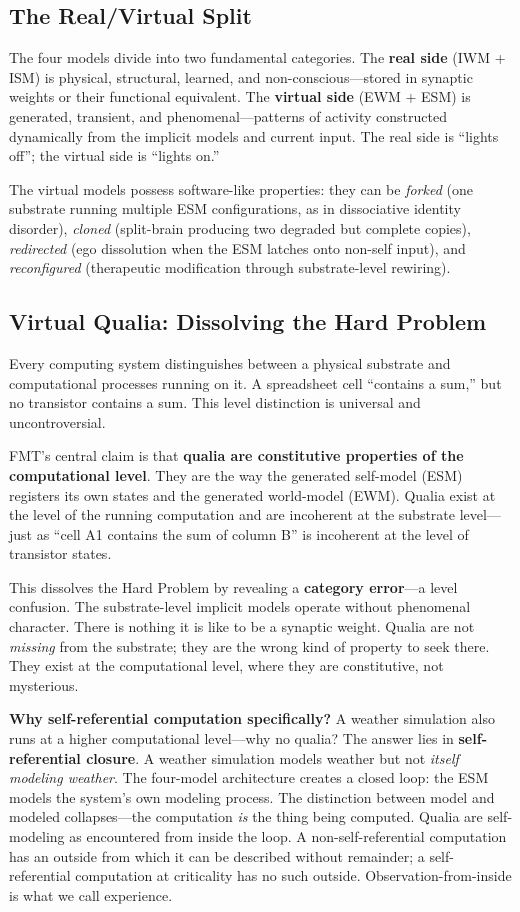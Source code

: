 \documentclass[11pt]{article}
\begin{document}
\subsection{The Real/Virtual Split}

The four models divide into two fundamental categories. The \textbf{real side} (IWM + ISM) is physical, structural, learned, and non-conscious---stored in synaptic weights or their functional equivalent. The \textbf{virtual side} (EWM + ESM) is generated, transient, and phenomenal---patterns of activity constructed dynamically from the implicit models and current input. The real side is ``lights off''; the virtual side is ``lights on.''

The virtual models possess software-like properties: they can be \emph{forked} (one substrate running multiple ESM configurations, as in dissociative identity disorder), \emph{cloned} (split-brain producing two degraded but complete copies), \emph{redirected} (ego dissolution when the ESM latches onto non-self input), and \emph{reconfigured} (therapeutic modification through substrate-level rewiring).

\subsection{Virtual Qualia: Dissolving the Hard Problem}

Every computing system distinguishes between a physical substrate and computational processes running on it. A spreadsheet cell ``contains a sum,'' but no transistor contains a sum. This level distinction is universal and uncontroversial.

FMT's central claim is that \textbf{qualia are constitutive properties of the computational level}. They are the way the generated self-model (ESM) registers its own states and the generated world-model (EWM). Qualia exist at the level of the running computation and are incoherent at the substrate level---just as ``cell A1 contains the sum of column B'' is incoherent at the level of transistor states.

This dissolves the Hard Problem by revealing a \textbf{category error}---a level confusion. The substrate-level implicit models operate without phenomenal character. There is nothing it is like to be a synaptic weight. Qualia are not \emph{missing} from the substrate; they are the wrong kind of property to seek there. They exist at the computational level, where they are constitutive, not mysterious.

\textbf{Why self-referential computation specifically?} A weather simulation also runs at a higher computational level---why no qualia? The answer lies in \textbf{self-referential closure}. A weather simulation models weather but not \emph{itself modeling weather}. The four-model architecture creates a closed loop: the ESM models the system's own modeling process. The distinction between model and modeled collapses---the computation \emph{is} the thing being computed. Qualia are self-modeling as encountered from inside the loop. A non-self-referential computation has an outside from which it can be described without remainder; a self-referential computation at criticality has no such outside. Observation-from-inside is what we call experience.
\end{document}
